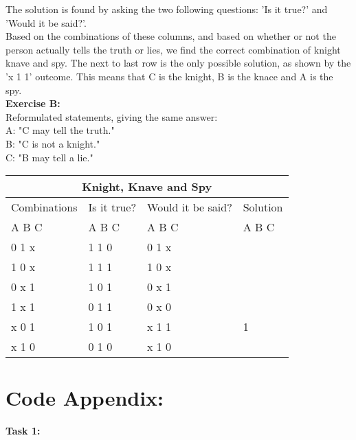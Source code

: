 \documentclass[11pt]{amsart}
\begin{document}
The solution is found by asking the two following questions: 'Is it true?' and 'Would it be said?'. \\

Based on the combinations of these columns, and based on whether or not the person actually tells the truth or lies,
we find the correct combination of knight knave and spy. The next to last row is the only possible solution,
as shown by the 'x 1 1' outcome. This means that C is the knight, B is the knace and A is the spy. \\


\textbf{Exercise B:} \\
Reformulated statements, giving the same answer:\\

	A: "C may tell the truth."\\
	B: "C is not a knight."\\
	C: "B may tell a lie." \\


\begin{tabular}{ |p{3cm}||p{3cm}|p{3cm}|p{3cm}|  }
	\hline
	\multicolumn{4}{|c|}{Knight, Knave and Spy} \\
	\hline
	 Combinations & Is it true? & Would it be said? & Solution  \\ A  B  C   &   A  B  C  &   A  B  C & A  B  C \\
	\hline
	  0   1   x  	& 1	1	0   & 0 1 x	&  \\
	  1   0   x		& 1	1	1  	& 1 0 x &  \\
	  0   x   1 	&	1	0	1 	& 0 x 1	&  \\
	  1   x   1  	&	0	1	1 	& 0 x 0	&  \\
	  x   0   1		& 1	0	1  	& x 1 1	& 1\\
	  x   1   0		& 0	1	0  	& x 1 0 &  \\

	\hline
\end{tabular}


\section{\textbf{Code Appendix:}}

\textbf{Task 1:}
\end{document}
